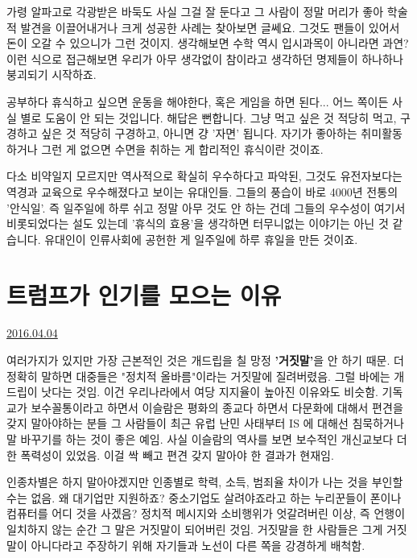 가령 알파고로 각광받은 바둑도 사실 그걸 잘 둔다고 그 사람이 정말 머리가 좋아 학술적 발견을 이끌어내거나 크게 성공한 사례는 찾아보면 글쎄요.
그것도 팬들이 있어서 돈이 오갈 수 있으니가 그런 것이지.
생각해보면 수학 역시 입시과목이 아니라면 과연?
이런 식으로 접근해보면 우리가 아무 생각없이 참이라고 생각하던 명제들이 하나하나 붕괴되기 시작하죠.
\vspace{5mm}

공부하다 휴식하고 싶으면 운동을 해야한다, 혹은 게임을 하면 된다... 어느 쪽이든 사실 별로 도움이 안 되는 것입니다.
해답은 뻔합니다. 그냥 먹고 싶은 것 적당히 먹고, 구경하고 싶은 것 적당히 구경하고, 아니면 걍 '자면' 됩니다.
자기가 좋아하는 취미활동하거나 그런 게 없으면 수면을 취하는 게 합리적인 휴식이란 것이죠.
\vspace{5mm}

다소 비약일지 모르지만 역사적으로 확실히 우수하다고 파악된, 그것도 유전자보다는 역경과 교육으로 우수해졌다고 보이는 유대인들.
그들의 풍습이 바로 4000년 전통의 '안식일'. 즉 일주일에 하루 쉬고 정말 아무 것도 안 하는 건데
그들의 우수성이 여기서 비롯되었다는 설도 있는데 '휴식의 효용'을 생각하면 터무니없는 이야기는 아닌 것 같습니다.
유대인이 인류사회에 공헌한 게 일주일에 하루 휴일을 만든 것이죠.
\vspace{5mm}





\section{트럼프가 인기를 모으는 이유}
\href{https://www.kockoc.com/Apoc/711025}{2016.04.04}

\vspace{5mm}

여러가지가 있지만 가장 근본적인 것은
개드립을 칠 망정 \textbf{'거짓말'}을 안 하기 때문.
더 정확히 말하면 대중들은 "정치적 올바름"이라는 거짓말에 질려버렸음.
그럴 바에는 개드립이 낫다는 것임. 이건 우리나라에서 여당 지지율이 높아진 이유와도 비슷함.
기독교가 보수꼴통이라고 하면서 이슬람은 평화의 종교다 하면서 다문화에 대해서 편견을 갖지 말아야하는 분들
그 사람들이 최근 유럽 난민 사태부터 IS 에 대해선 침묵하거나 말 바꾸기를 하는 것이 좋은 예임.
사실 이슬람의 역사를 보면 보수적인 개신교보다 더한 폭력성이 있었음. 이걸 싹 빼고 편견 갖지 말아야 한 결과가 현재임.
\vspace{5mm}

인종차별은 하지 말아야겠지만 인종별로 학력, 소득, 범죄율 차이가 나는 것을 부인할 수는 없음.
왜 대기업만 지원하죠? 중소기업도 살려야죠라고 하는 누리꾼들이 폰이나 컴퓨터를 어디 것을 사겠음?
정치적 메시지와 소비행위가 엇갈려버린 이상, 즉 언행이 일치하지 않는 순간 그 말은 거짓말이 되어버린 것임.
거짓말을 한 사람들은 그게 거짓말이 아니다라고 주장하기 위해 자기들과 노선이 다른 쪽을 강경하게 배척함.
\vspace{5mm}

